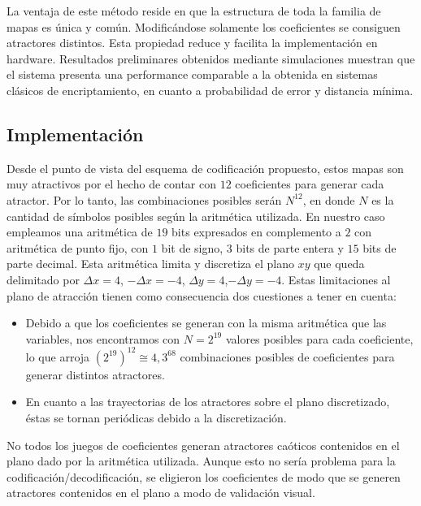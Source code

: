 La ventaja de este método reside en que la estructura de toda la familia de mapas es única y común.
Modificándose solamente los coeficientes se consiguen atractores distintos.
Esta propiedad reduce y facilita la implementación en hardware.
Resultados preliminares obtenidos mediante simulaciones muestran que el sistema presenta una performance comparable a la obtenida en sistemas clásicos de encriptamiento, en cuanto a probabilidad de error y distancia mínima.

\subsection{Implementación}

Desde el punto de vista del esquema de codificación propuesto, estos mapas son muy atractivos por el hecho de contar con $12$ coeficientes para generar cada atractor.
Por lo tanto, las combinaciones posibles serán $N^{12}$, en donde $N$ es la cantidad de símbolos posibles según la aritmética utilizada.
En nuestro caso empleamos una aritmética de $19$ bits expresados en complemento a $2$ con aritmética de punto fijo, con $1$ bit de signo, $3$ bits de parte entera y $15$ bits de parte decimal.
Esta aritmética limita y discretiza el plano $xy$ que queda delimitado por $\Delta x=4$, $-\Delta x=-4$, $\Delta y=4$,$-\Delta y=-4$.
Estas limitaciones al plano de atracción tienen como consecuencia dos cuestiones a tener en cuenta:
\begin{itemize}
    \item
        Debido a que los coeficientes se generan con la misma aritmética que las variables, nos encontramos con $N=2^{19}$ valores posibles para cada coeficiente, lo que arroja $\left(2^{19}\right)^{12}\cong4,3^{68}$ combinaciones posibles de coeficientes para generar distintos atractores.
    \item
        En cuanto a las trayectorias de los atractores sobre el plano discretizado, éstas se tornan periódicas debido a la discretización.
\end{itemize}

No todos los juegos de coeficientes generan atractores caóticos contenidos en el plano dado por la aritmética utilizada.
Aunque esto no sería problema para la codificación/decodificación, se eligieron los coeficientes de modo que se generen atractores contenidos en el plano a modo de validación visual.

